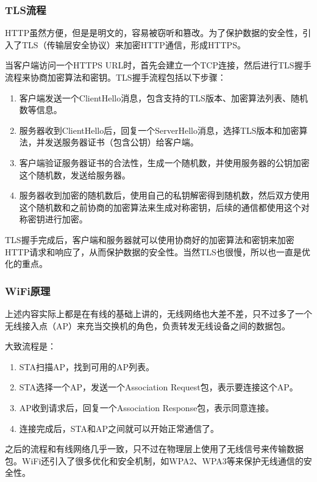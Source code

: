 \documentclass[fontset=none,aspectratio=1610]{ctexbeamer}
\begin{document}
\begin{frame}
    \frametitle{TLS流程}

    HTTP虽然方便，但是是明文的，容易被窃听和篡改。为了保护数据的安全性，引入了TLS（传输层安全协议）来加密HTTP通信，形成HTTPS。

    当客户端访问一个HTTPS URL时，首先会建立一个TCP连接，然后进行TLS握手流程来协商加密算法和密钥。TLS握手流程包括以下步骤：
    \begin{enumerate}
        \item 客户端发送一个ClientHello消息，包含支持的TLS版本、加密算法列表、随机数等信息。
        \item 服务器收到ClientHello后，回复一个ServerHello消息，选择TLS版本和加密算法，并发送服务器证书（包含公钥）给客户端。
        \item 客户端验证服务器证书的合法性，生成一个随机数，并使用服务器的公钥加密这个随机数，发送给服务器。
        \item 服务器收到加密的随机数后，使用自己的私钥解密得到随机数，然后双方使用这个随机数和之前协商的加密算法来生成对称密钥，后续的通信都使用这个对称密钥进行加密。
    \end{enumerate}
    TLS握手完成后，客户端和服务器就可以使用协商好的加密算法和密钥来加密HTTP请求和响应了，从而保护数据的安全性。当然TLS也很慢，所以也一直是优化的重点。

\end{frame}

\begin{frame}
    \frametitle{WiFi原理}

    上述内容实际上都是在有线的基础上讲的，无线网络也大差不差，只不过多了一个无线接入点（AP）来充当交换机的角色，负责转发无线设备之间的数据包。

    大致流程是：
    \begin{enumerate}
        \item STA扫描AP，找到可用的AP列表。
        \item STA选择一个AP，发送一个Association Request包，表示要连接这个AP。
        \item AP收到请求后，回复一个Association Response包，表示同意连接。
        \item 连接完成后，STA和AP之间就可以开始正常通信了。
    \end{enumerate}
    之后的流程和有线网络几乎一致，只不过在物理层上使用了无线信号来传输数据包。WiFi还引入了很多优化和安全机制，如WPA2、WPA3等来保护无线通信的安全性。

\end{frame}
\end{document}
